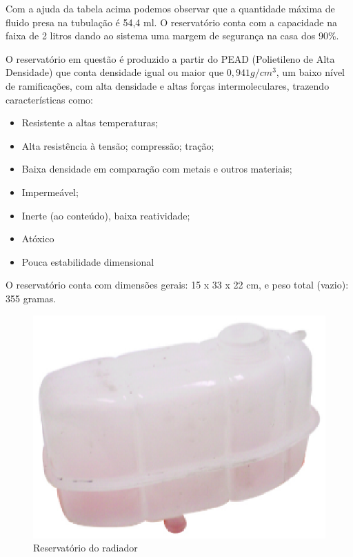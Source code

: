 Com a ajuda da tabela acima podemos observar que a quantidade máxima de fluido presa na tubulação é 54,4 ml. O reservatório conta com a capacidade na faixa de 2 litros dando ao sistema uma margem de segurança na casa dos 90\%. 

O reservatório em questão é produzido a partir do PEAD (Polietileno de Alta Densidade) que conta densidade igual ou maior que $0,941 g/cm^3	$, um baixo nível de ramificações, com alta densidade e altas forças intermoleculares, trazendo características como:
\begin{itemize}
\item Resistente a altas temperaturas;
\item Alta resistência à tensão; compressão; tração;
\item Baixa densidade em comparação com metais e outros materiais;
\item Impermeável;
\item Inerte (ao conteúdo), baixa reatividade;
\item Atóxico
\item Pouca estabilidade dimensional 
\end{itemize}
O reservatório conta com dimensões gerais: 15 x 33 x 22 cm, e peso total (vazio): 355 gramas.


\begin{figure}[!htb]                                                               
   \centering                                                                      
   \includegraphics[scale=0.6, keepaspectratio=true]{figuras/reservatorio.eps} 
   \caption{Reservatório do radiador}
\end{figure}

